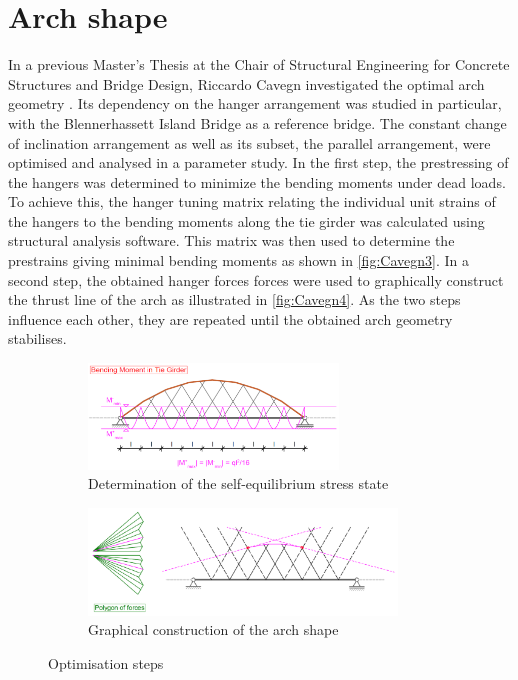 \section{Arch shape} \label{sec:rev_prev}
In a previous Master's Thesis at the Chair of Structural Engineering for Concrete Structures and Bridge Design, Riccardo Cavegn investigated the optimal arch geometry \cite{Cavegn}. Its dependency on the hanger arrangement was studied in particular, with the Blennerhassett Island Bridge as a reference bridge. The constant change of inclination arrangement as well as its subset, the parallel arrangement, were optimised and analysed in a parameter study. 
In the first step, the prestressing of the hangers was determined to minimize the bending moments under dead loads. To achieve this, the hanger tuning matrix relating the individual unit strains of the hangers to the bending moments along the tie girder was calculated using structural analysis software. This matrix was then used to determine the prestrains giving minimal bending moments as shown in \autoref{fig:Cavegn3}. In a second step, the obtained hanger forces forces were used to graphically construct the thrust line of the arch as illustrated in \autoref{fig:Cavegn4}. As the two steps influence each other, they are repeated until the obtained arch geometry stabilises.
\begin{figure}[H]
\centering
\begin{subfigure}{0.5\textwidth}
    \centering
    \includegraphics[width=0.73\textwidth]{Pictures/OptimizedBendingMoment.PNG}
    \caption{Determination of the self-equilibrium stress state}
    \label{fig:Cavegn3}
\end{subfigure}%
\begin{subfigure}{.5\textwidth}
    \centering
    \includegraphics[width=0.9\textwidth]{Pictures/GraphicalThrustLineConstruction.PNG}
    \caption{Graphical construction of the arch shape}
    \label{fig:Cavegn4}
\end{subfigure}
\caption{Optimisation steps \cite{Cavegn}}
\label{fig:Cavegn34}
\end{figure}
